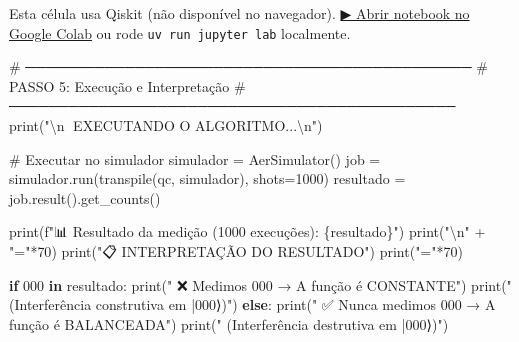 \documentclass[
  brazilian,
]{report}
\newenvironment{Shaded}{\begin{snugshade}}{\end{snugshade}}
\newcommand{\BuiltInTok}[1]{\textcolor[rgb]{0.00,0.23,0.31}{#1}}
\newcommand{\CharTok}[1]{\textcolor[rgb]{0.13,0.47,0.30}{#1}}
\newcommand{\CommentTok}[1]{\textcolor[rgb]{0.37,0.37,0.37}{#1}}
\newcommand{\ControlFlowTok}[1]{\textcolor[rgb]{0.00,0.23,0.31}{\textbf{#1}}}
\newcommand{\DecValTok}[1]{\textcolor[rgb]{0.68,0.00,0.00}{#1}}
\newcommand{\KeywordTok}[1]{\textcolor[rgb]{0.00,0.23,0.31}{\textbf{#1}}}
\newcommand{\NormalTok}[1]{\textcolor[rgb]{0.00,0.23,0.31}{#1}}
\newcommand{\OperatorTok}[1]{\textcolor[rgb]{0.37,0.37,0.37}{#1}}
\newcommand{\SpecialCharTok}[1]{\textcolor[rgb]{0.37,0.37,0.37}{#1}}
\newcommand{\SpecialStringTok}[1]{\textcolor[rgb]{0.13,0.47,0.30}{#1}}
\newcommand{\StringTok}[1]{\textcolor[rgb]{0.13,0.47,0.30}{#1}}
\begin{document}
\begin{tcolorbox}[enhanced jigsaw, arc=.35mm, bottomrule=.15mm, bottomtitle=1mm, breakable, colback=white, colbacktitle=quarto-callout-warning-color!10!white, colframe=quarto-callout-warning-color-frame, coltitle=black, left=2mm, leftrule=.75mm, opacityback=0, opacitybacktitle=0.6, rightrule=.15mm, title=\textcolor{quarto-callout-warning-color}{\faExclamationTriangle}\hspace{0.5em}{⚛️ Célula Qiskit --- execute no Colab ou localmente}, titlerule=0mm, toprule=.15mm, toptitle=1mm]

Esta célula usa Qiskit (não disponível no navegador).
\href{https://colab.research.google.com/github/maxwellamaral/aula-quantum/blob/main/notebooks/05-interference.ipynb}{▶
Abrir notebook no Google Colab} ou rode \texttt{uv\ run\ jupyter\ lab}
localmente.

\begin{Shaded}
\begin{Highlighting}[]


\CommentTok{\# ─────────────────────────────────────────────}
\CommentTok{\# PASSO 5: Execução e Interpretação}
\CommentTok{\# ─────────────────────────────────────────────}
\BuiltInTok{print}\NormalTok{(}\StringTok{"}\CharTok{\textbackslash{}n}\StringTok{🚀 EXECUTANDO O ALGORITMO...}\CharTok{\textbackslash{}n}\StringTok{"}\NormalTok{)}

\CommentTok{\# Executar no simulador}
\NormalTok{simulador }\OperatorTok{=}\NormalTok{ AerSimulator()}
\NormalTok{job }\OperatorTok{=}\NormalTok{ simulador.run(transpile(qc, simulador), shots}\OperatorTok{=}\DecValTok{1000}\NormalTok{)}
\NormalTok{resultado }\OperatorTok{=}\NormalTok{ job.result().get\_counts()}

\BuiltInTok{print}\NormalTok{(}\SpecialStringTok{f"📊 Resultado da medição (1000 execuções): }\SpecialCharTok{\{}\NormalTok{resultado}\SpecialCharTok{\}}\SpecialStringTok{"}\NormalTok{)}
\BuiltInTok{print}\NormalTok{(}\StringTok{"}\CharTok{\textbackslash{}n}\StringTok{"} \OperatorTok{+} \StringTok{"="}\OperatorTok{*}\DecValTok{70}\NormalTok{)}
\BuiltInTok{print}\NormalTok{(}\StringTok{"📋 INTERPRETAÇÃO DO RESULTADO"}\NormalTok{)}
\BuiltInTok{print}\NormalTok{(}\StringTok{"="}\OperatorTok{*}\DecValTok{70}\NormalTok{)}

\ControlFlowTok{if} \StringTok{\textquotesingle{}000\textquotesingle{}} \KeywordTok{in}\NormalTok{ resultado:}
    \BuiltInTok{print}\NormalTok{(}\StringTok{"   ❌ Medimos \textquotesingle{}000\textquotesingle{} → A função é CONSTANTE"}\NormalTok{)}
    \BuiltInTok{print}\NormalTok{(}\StringTok{"   (Interferência construtiva em |000⟩)"}\NormalTok{)}
\ControlFlowTok{else}\NormalTok{:}
    \BuiltInTok{print}\NormalTok{(}\StringTok{"   ✅ Nunca medimos \textquotesingle{}000\textquotesingle{} → A função é BALANCEADA"}\NormalTok{)}
    \BuiltInTok{print}\NormalTok{(}\StringTok{"   (Interferência destrutiva em |000⟩)"}\NormalTok{)}


\end{Highlighting}
\end{Shaded}
\end{tcolorbox}
\end{document}

